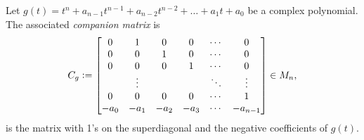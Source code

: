 \begin{definition}
\label{def:companion-matrix}
Let $g(t) = t^n + a_{n-1}t^{n-1} + a_{n-2}t^{n-2} + \dots + a_1 t + a_0$ be a complex polynomial. The associated \textit{companion matrix} is 
$$
C_g \vcentcolon= \begin{bmatrix}
 0 & 1 & 0 & 0 & \cdots & 0 \\
 0 & 0 & 1 & 0 & \cdots & 0 \\
 0 & 0 & 0 & 1 & \cdots & 0 \\
   & \vdots & & & \ddots & \vdots \\
 0 & 0 & 0 & 0 & \cdots & 1 \\
 -a_0 & -a_1 & -a_2 & -a_3 & \cdots & -a_{n-1}
\end{bmatrix} \in M_n,
$$
is the matrix with 1's on the superdiagonal and the negative coefficients of $g(t)$.
\end{definition}

